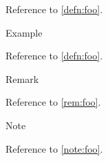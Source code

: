 Reference to \cref{defn:foo}.

\begin{exmp}\label{exmp:foo}
  Example
\end{exmp}

Reference to \cref{defn:foo}.

\begin{rem}\label{rem:foo}
  Remark
\end{rem}

Reference to \cref{rem:foo}.

\begin{note}\label{note:foo}
  Note
\end{note}

Reference to \cref{note:foo}.

